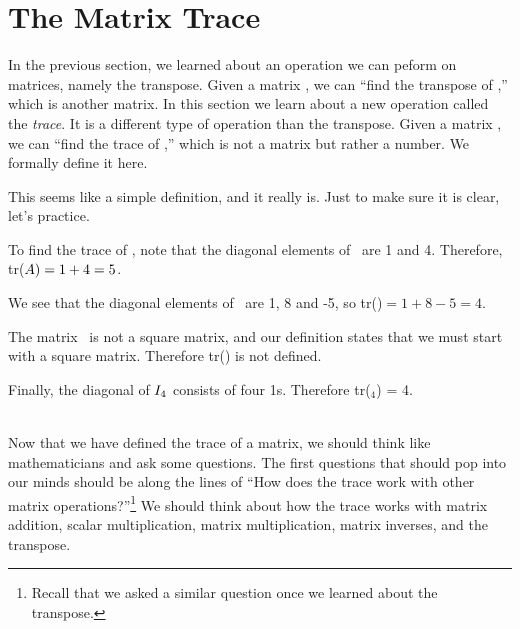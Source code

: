 \section{The Matrix Trace}\label{sec:trace}


In the previous section, we learned about an operation we can peform on matrices, namely the transpose. Given a matrix \tta, we can ``find the transpose of \tta,'' which is another matrix. In this section we learn about a new operation called the \textit{trace}. It is a different type of operation than the transpose. Given a matrix \tta, we can ``find the trace of \tta,'' which is not a matrix but rather a number. We formally define it here.


This seems like a simple definition, and it really is. Just to make sure it is clear, let's practice.\\

{To find the trace of \tta, note that the diagonal elements of \tta\ are 1 and 4. Therefore, tr($A) = 1+4 = 5$.

We see that the diagonal elements of \ttb\ are 1, 8 and -5, so tr(\ttb)$ = 1+8-5 = 4$.

The matrix \ttc\ is not a square matrix, and our definition states that we must start with a square matrix. Therefore tr(\ttc) is not defined.

Finally, the diagonal of $I_4$ consists of four 1s. Therefore tr(\tti$_4$) = 4.}\\ %

Now that we have defined the trace of a matrix, we should think like mathematicians and ask some questions. The first questions that should pop into our minds should be along the lines of ``How does the trace work with other matrix operations?''\footnote{Recall that we asked a similar question once we learned about the transpose.} We should think about how the trace works with matrix addition, scalar multiplication, matrix multiplication, matrix inverses, and the transpose.

